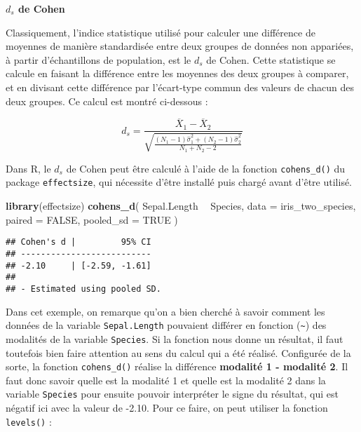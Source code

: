 \documentclass[
  french,
]{book}
\newenvironment{Shaded}{\begin{snugshade}}{\end{snugshade}}
\newcommand{\DataTypeTok}[1]{\textcolor[rgb]{0.13,0.29,0.53}{#1}}
\newcommand{\KeywordTok}[1]{\textcolor[rgb]{0.13,0.29,0.53}{\textbf{#1}}}
\newcommand{\NormalTok}[1]{#1}
\newcommand{\OperatorTok}[1]{\textcolor[rgb]{0.81,0.36,0.00}{\textbf{#1}}}
\newcommand{\OtherTok}[1]{\textcolor[rgb]{0.56,0.35,0.01}{#1}}
\newcommand{\StringTok}[1]{\textcolor[rgb]{0.31,0.60,0.02}{#1}}
\begin{document}
\textbf{\(d_{s}\) de Cohen}

Classiquement, l'indice statistique utilisé pour calculer une différence de moyennes de manière standardisée entre deux groupes de données non appariées, à partir d'échantillons de population, est le \(d_{s}\) de Cohen. Cette statistique se calcule en faisant la différence entre les moyennes des deux groupes à comparer, et en divisant cette différence par l'écart-type commun des valeurs de chacun des deux groupes. Ce calcul est montré ci-dessous :

\[d_{s} = \frac{\overline{X}_{1} - \overline{X}_{2}} {\sqrt{\frac{(N_{1} - 1) \hat{\sigma}_{1}^2 + (N_{2} - 1) \hat{\sigma}_{2}^2} {N_{1} + N_{2} - 2}}}\]

Dans R, le \(d_{s}\) de Cohen peut être calculé à l'aide de la fonction \texttt{cohens\_d()} du package \texttt{effectsize}, qui nécessite d'être installé puis chargé avant d'être utilisé.

\begin{Shaded}
\begin{Highlighting}[]
\KeywordTok{library}\NormalTok{(effectsize)}
\KeywordTok{cohens_d}\NormalTok{(}
\NormalTok{  Sepal.Length }\OperatorTok{~}\StringTok{ }\NormalTok{Species, }
  \DataTypeTok{data =}\NormalTok{ iris_two_species, }
  \DataTypeTok{paired =} \OtherTok{FALSE}\NormalTok{, }
  \DataTypeTok{pooled_sd =} \OtherTok{TRUE}
\NormalTok{  )}
\end{Highlighting}
\end{Shaded}

\begin{verbatim}
## Cohen's d |         95% CI
## --------------------------
## -2.10     | [-2.59, -1.61]
## 
## - Estimated using pooled SD.
\end{verbatim}

Dans cet exemple, on remarque qu'on a bien cherché à savoir comment les données de la variable \texttt{Sepal.Length} pouvaient différer en fonction (\texttt{\textasciitilde{}}) des modalités de la variable \texttt{Species}. Si la fonction nous donne un résultat, il faut toutefois bien faire attention au sens du calcul qui a été réalisé. Configurée de la sorte, la fonction \texttt{cohens\_d()} réalise la différence \textbf{modalité 1 - modalité 2}. Il faut donc savoir quelle est la modalité 1 et quelle est la modalité 2 dans la variable \texttt{Species} pour ensuite pouvoir interpréter le signe du résultat, qui est négatif ici avec la valeur de -2.10. Pour ce faire, on peut utiliser la fonction \texttt{levels()} :
\end{document}
